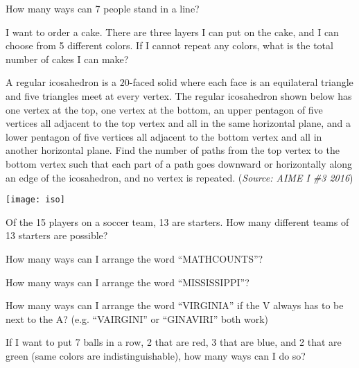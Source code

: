 \begin{problem}
How many ways can 7 people stand in a line?
\end{problem}

\begin{problem}
I want to order a cake. There are three layers I can put on the cake, and I can choose from 5 different colors. If I cannot repeat any colors, what is the total number of cakes I can make?
\end{problem}

\begin{problem}
A regular icosahedron is a $20$-faced solid where each face is an equilateral triangle and five triangles meet at every vertex. The regular icosahedron shown below has one vertex at the top, one vertex at the bottom, an upper pentagon of five vertices all adjacent to the top vertex and all in the same horizontal plane, and a lower pentagon of five vertices all adjacent to the bottom vertex and all in another horizontal plane. Find the number of paths from the top vertex to the bottom vertex such that each part of a path goes downward or horizontally along an edge of the icosahedron, and no vertex is repeated. (\textit{Source: AIME I \#3 2016})
 \begin{center}
 \texttt{[image: iso]}
 \end{center}
\end{problem}

\begin{problem}
Of the 15 players on a soccer team, 13 are starters. How many different teams of 13 starters are possible?
\end{problem}

\begin{problem}
How many ways can I arrange the word ``MATHCOUNTS''?
\end{problem}

\begin{problem}
How many ways can I arrange the word ``MISSISSIPPI''?
\end{problem}

\begin{problem}
How many ways can I arrange the word ``VIRGINIA'' if the V always has to be next to the A? (e.g. ``VAIRGINI'' or ``GINAVIRI'' both work)
\end{problem}

\begin{problem}
If I want to put 7 balls in a row, 2 that are red, 3 that are blue, and 2 that are green (same colors are indistinguishable), how many ways can I do so?
\end{problem}

